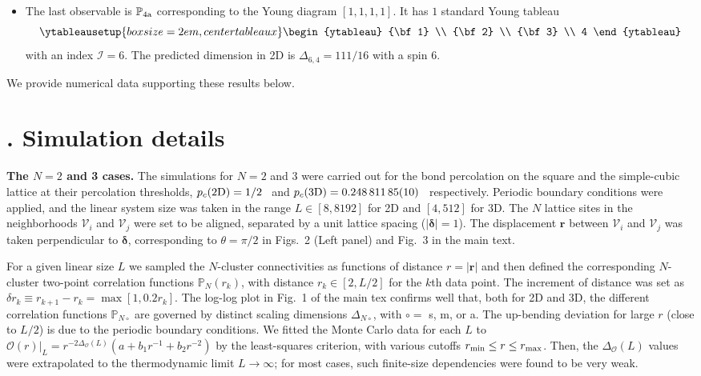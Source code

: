 \documentclass[aps,prl,twocolumn,showpacs,superscriptaddress,groupedaddress]{revtex4}  %
\def\bbp{{\mathbb P}}
\newcommand*{\rom}[1]{\expandafter \romannumeral #1}
\begin{document}
\begin{itemize}
\item The last observable is $\mathbb P_{\rm 4a}$ corresponding to the Young diagram $[1,1,1,1]$. It has $1$ standard Young tableau
\begin{equation}
\ytableausetup{boxsize=2em,centertableaux}
\begin{ytableau}
 {\bf 1}  \\
 {\bf 2} \\
 {\bf 3} \\
 4
\end{ytableau}
\end{equation}
with an index $\mathcal{I}=6$. The predicted dimension in 2D is $\Delta_{6,4}=111/16$ with a spin $6$.
\end{itemize}
%
We provide numerical data supporting these results below.

\section{\rom{2}. Simulation details}
{\bf The $N=2$ and 3 cases.} The simulations for $N=2$ and 3  were carried out for the bond percolation 
on the square and the simple-cubic lattice at their percolation thresholds, $p_c (\rm 2D) =1/2$~\cite{kesten1980}
and $p_c(\rm 3D) = 0.248 \, 811 \, 85(10)$~\cite{Wang2013,xu2014} respectively.  Periodic boundary conditions were applied, 
and the linear system size was taken  in the range $ L \in [8, 8192]$ for 2D and $ [4, 512]$ for 3D. 
The $N$ lattice sites in the neighborhoods $\mathcal{V}_i$ and $\mathcal{V}_j$ were set to be aligned, separated by 
a unit lattice spacing ($|\boldsymbol\delta|=1$). The displacement $\mathbf{r}$ between $\mathcal{V}_i$ and $\mathcal{V}_j$ 
was taken perpendicular to $\boldsymbol{\delta}$, corresponding to $\theta=\pi/2$ in Figs.~2 (Left panel) and Fig.~3 in the main text. 

For a given linear size $L$ we sampled the $N$-cluster connectivities as functions of distance 
$r = |\mathbf{r}|$ and then defined the corresponding $N$-cluster two-point correlation functions $\bbp_{N}(r_k)$,
with  distance $r_k \in [2,L/2]$ for the $k$th data point. The increment of distance was set as $\delta r_k \equiv r_{k+1}-r_k = \max[1, 0.2r_k]$.
The log-log plot in Fig.~1 of the main tex confirms well that, both for 2D and 3D, the different correlation functions $\bbp_{N\circ}$ 
are governed by distinct scaling dimensions $\Delta_{N\circ}$, with $\circ=$ s, m, or a.
The up-bending deviation for large $r$ (close to $L/2$) is due to the periodic boundary conditions. 
We fitted the Monte Carlo data for each $L$ to $ \mathcal{O} (r)|_L= r^{-2 \Delta_{\mathcal{O}}(L)} (a+b_1r^{-1} +b_2 r^{-2})$ by 
the least-squares criterion, with various cutoffs $r_{\rm min} \leq r \leq r_{\rm max}$. 
Then, the $\Delta_{\mathcal{O}}(L)$ values were extrapolated to the thermodynamic limit $L \rightarrow \infty $;
for most cases, such finite-size dependencies were found to be very weak. 
\end{document}
